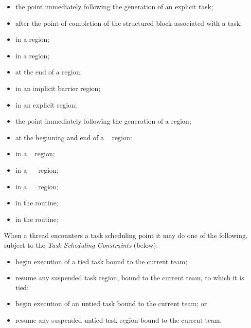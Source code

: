 \begin{itemize}
\item the point immediately following the generation of an explicit task;

\item after the point of completion of the structured block associated with a task;

\item in a  region;

\item in a  region;

\item at the end of a  region;

\item in an implicit barrier region;

\item in an explicit  region;

\item the point immediately following the generation of a  region;

\item at the beginning and end of a ~ region;

\item in a ~ region;

\item in a ~~ region;

\item in a ~~ region;

\item in the  routine;

\item in the  routine;
\end{itemize}

When a thread encounters a task scheduling point it may do one of the following,
subject to the \emph{Task Scheduling Constraints} (below):

\begin{itemize}
\item begin execution of a tied task bound to the current team;

\item resume any suspended task region, bound to the current team, to which it is tied;

\item begin execution of an untied task bound to the current team; or

\item resume any suspended untied task region bound to the current team.
\end{itemize}

